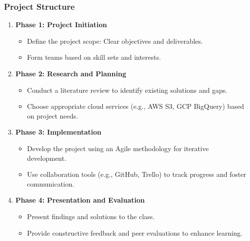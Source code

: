 \documentclass[aspectratio=169]{beamer}
\begin{document}
\begin{frame}[fragile]
    \frametitle{Project Structure}
    \begin{enumerate}
        \item \textbf{Phase 1: Project Initiation}
        \begin{itemize}
            \item Define the project scope: Clear objectives and deliverables.
            \item Form teams based on skill sets and interests.
        \end{itemize}
        
        \item \textbf{Phase 2: Research and Planning}
        \begin{itemize}
            \item Conduct a literature review to identify existing solutions and gaps.
            \item Choose appropriate cloud services (e.g., AWS S3, GCP BigQuery) based on project needs.
        \end{itemize}
        
        \item \textbf{Phase 3: Implementation}
        \begin{itemize}
            \item Develop the project using an Agile methodology for iterative development.
            \item Use collaboration tools (e.g., GitHub, Trello) to track progress and foster communication.
        \end{itemize}
        
        \item \textbf{Phase 4: Presentation and Evaluation}
        \begin{itemize}
            \item Present findings and solutions to the class.
            \item Provide constructive feedback and peer evaluations to enhance learning.
        \end{itemize}
    \end{enumerate}
\end{frame}
\end{document}
